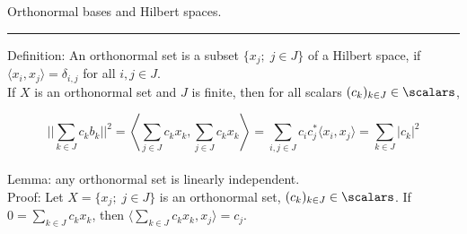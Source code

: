 \break

Orthonormal bases and Hilbert spaces.

\vspace{0.1in}

\hrule

\vspace{0.5in}

Definition: An orthonormal set is a subset $\{ x_j; \; j\in J\}$ of a Hilbert space, if $ \langle x_i, x_j \rangle = \delta_{i,j}$ for all $i,j \in J$.  \\

\noindent
If $X$ is an orthonormal set and $J$ is finite, then for all scalars $(c_k)_{k \in J} \in \scalars$,

$$
    || \sum_{k \in J} c_k b_k || ^2 = \left \langle \sum_{j \in J} c_k x_k, \sum_{j \in J} c_k x_k \right \rangle = \sum_{i,j \in J} c_i c_j^* \langle x_i, x_j \rangle = \sum_{k \in J} |c_k|^2
$$ \\

Lemma: any orthonormal set is linearly independent. \\

\noindent
Proof: Let $X = \{ x_j; \; j\in J\}$ is an orthonormal set, $(c_k)_{k \in J} \in \scalars$. If $0 = \sum_{k \in J} c_k x_k$, then $\langle \sum_{k \in J} c_k x_k, x_j \rangle = c_j$.
































